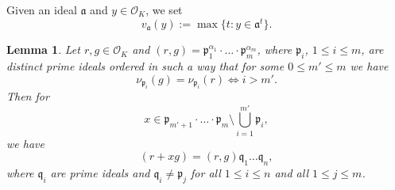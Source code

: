 \documentclass[leqno,a4paper,12pt]{article}
\newtheorem{Lemma}[Th]{Lemma}
\theoremstyle{definition}
\newcommand{\OK}{\mathcal{O}_K}
\begin{document}
Given an ideal $\mathfrak{a}$ and $y\in\OK$, we set
\[
v_{\mathfrak{a}}(y):=\max\{t : y\in \mathfrak{a}^t\}.
\]
\begin{Lemma}\label{lem3_multi}
Let $r,g\in\OK$ and $(r,g)=\mathfrak{p}_1^{\alpha_1}\cdot\ldots\cdot\mathfrak{p}_m^{\alpha_m}$, where $\mathfrak{p}_i$, $1\leq i\leq m$, are distinct prime ideals ordered in such a way that for some $0\leq m'\leq m$ we have
\begin{equation}\label{c3}
\nu_{\mathfrak{p}_i}(g)=\nu_{\mathfrak{p}_i}(r) \iff i>m'.
\end{equation}
Then for
\[
x\in\mathfrak{p}_{m'+1}\cdot\ldots\cdot\mathfrak{p}_m\setminus\bigcup_{i=1}^{m'}\mathfrak{p}_i,
\]
we have
\[(r+xg)=(r,g)\mathfrak{q}_1\ldots\mathfrak{q}_n,\]
where $\mathfrak{q}_i$ are prime ideals and $\mathfrak{q}_i\neq\mathfrak{p}_j$ for all $1\leq i\leq n$ and all $1\leq j\leq m$.
\end{Lemma}
\end{document}
